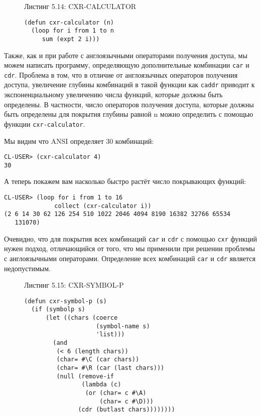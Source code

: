 \begin{figure}Листинг 5.14: CXR-CALCULATOR\label{listing_5.14}
\listbegin
\begin{verbatim}
(defun cxr-calculator (n)
  (loop for i from 1 to n
     sum (expt 2 i)))
\end{verbatim}
\listend
\end{figure}

Также, как и при работе с англоязычными операторами получения доступа, мы можем написать программу, определяющую дополнительные комбинации \verb|car| и \verb|cdr|. Проблема в том, что в отличие от англоязычных операторов получения доступа, увеличение глубины комбинаций в такой функции как \verb|caddr| приводит к экспоненциальному увеличению числа функций, которые должны быть определены. В частности, число операторов получения доступа, которые должны быть определены для покрытия глубины равной n можно определить с помощью функции \verb|cxr-calculator|.

Мы видим что ANSI определяет 30 комбинаций:

\begin{verbatim}
CL-USER> (cxr-calculator 4)
30
\end{verbatim}

А теперь покажем вам насколько быстро растёт число покрывающих функций:

\begin{verbatim}
CL-USER> (loop for i from 1 to 16
              collect (cxr-calculator i))
(2 6 14 30 62 126 254 510 1022 2046 4094 8190 16382 32766 65534 
   131070)
\end{verbatim}

Очевидно, что для покрытия всех комбинаций \verb|car| и \verb|cdr| с помощью \verb|cxr| функций нужен подход, отличающийся от того, что мы применили при решении проблемы с англоязычными операторами. Определение всех комбинаций \verb|car| и \verb|cdr| является недопустимым.

\begin{figure}Листинг 5.15: CXR-SYMBOL-P\label{listing_5.15}
\listbegin
\begin{verbatim}
(defun cxr-symbol-p (s)
  (if (symbolp s)
      (let ((chars (coerce
                    (symbol-name s)
                    'list)))
        (and
         (< 6 (length chars))
         (char= #\C (car chars))
         (char= #\R (car (last chars)))
         (null (remove-if
                (lambda (c)
                 (or (char= c #\A)
                     (char= c #\D)))
               (cdr (butlast chars))))))))
\end{verbatim}
\listend
\end{figure}

